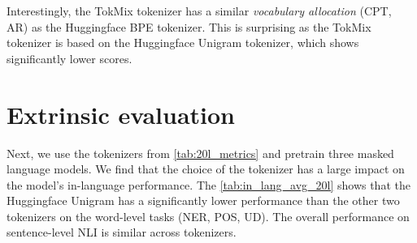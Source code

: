 Interestingly, the TokMix tokenizer has a similar \textit{vocabulary allocation} (CPT, AR) as the Huggingface BPE tokenizer. This is surprising as the TokMix tokenizer is based on the Huggingface Unigram tokenizer, which shows significantly lower scores.

\section{Extrinsic evaluation}

Next, we use the tokenizers from \autoref{tab:20l_metrics} and pretrain three masked language models. We find that the choice of the tokenizer has a large impact on the model's in-language performance. The \autoref{tab:in_lang_avg_20l} shows that the Huggingface Unigram has a significantly lower performance than the other two tokenizers on the word-level tasks (NER, POS, UD). The overall performance on sentence-level NLI is similar across tokenizers. %

